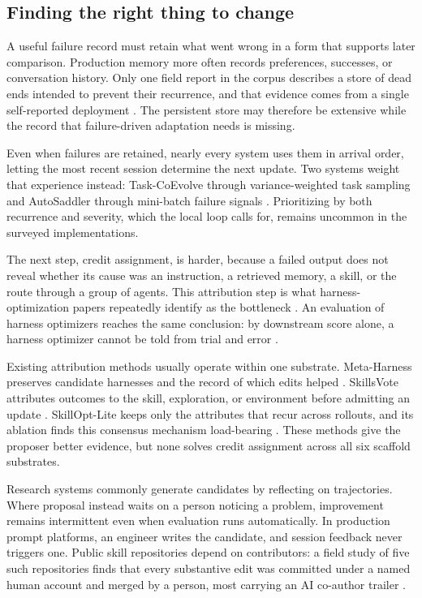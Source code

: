\subsection{Finding the right thing to change}\label{finding-the-right-thing-to-change}

A useful failure record must retain what went wrong in a form that supports later comparison. Production memory more often records preferences, successes, or conversation history. Only one field report in the corpus describes a store of dead ends intended to prevent their recurrence, and that evidence comes from a single self-reported deployment \cite{helwig2026memory}. The persistent store may therefore be extensive while the record that failure-driven adaptation needs is missing.

Even when failures are retained, nearly every system uses them in arrival order, letting the most recent session determine the next update. Two systems weight that experience instead: Task-CoEvolve through variance-weighted task sampling and AutoSaddler through mini-batch failure signals \cite{miyai2026taskcoevolve, park2026autosaddler}. Prioritizing by both recurrence and severity, which the local loop calls for, remains uncommon in the surveyed implementations.

The next step, credit assignment, is harder, because a failed output does not reveal whether its cause was an instruction, a retrieved memory, a skill, or the route through a group of agents. This attribution step is what harness-optimization papers repeatedly identify as the bottleneck \cite{lin2026ahe, zehle2026cantante, lee2026metaharness, nguyen2026harnessevo, liu2026skillsvote}. An evaluation of harness optimizers reaches the same conclusion: by downstream score alone, a harness optimizer cannot be told from trial and error \cite{ong2026harnesseval}.

Existing attribution methods usually operate within one substrate. Meta-Harness preserves candidate harnesses and the record of which edits helped \cite{lee2026metaharness}. SkillsVote attributes outcomes to the skill, exploration, or environment before admitting an update \cite{liu2026skillsvote}. SkillOpt-Lite keeps only the attributes that recur across rollouts, and its ablation finds this consensus mechanism load-bearing \cite{shen2026skilloptlite}. These methods give the proposer better evidence, but none solves credit assignment across all six scaffold substrates.

Research systems commonly generate candidates by reflecting on trajectories. Where proposal instead waits on a person noticing a problem, improvement remains intermittent even when evaluation runs automatically. In production prompt platforms, an engineer writes the candidate, and session feedback never triggers one. Public skill repositories depend on contributors: a field study of five such repositories finds that every substantive edit was committed under a named human account and merged by a person, most carrying an AI co-author trailer \cite{shen2026whomaintains}.


